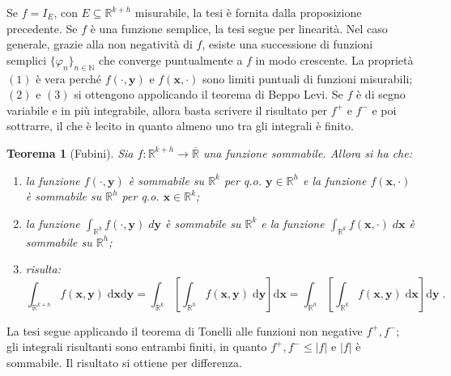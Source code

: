 \documentclass[a4paper,12pt]{report}
\theoremstyle{plain}
\newtheorem{thm}{Teorema}[section]
\theoremstyle{definition}
\theoremstyle{remark}
\newcommand{\diff}[1]{\mathrm{d}#1}
\numberwithin{equation}{section}
\begin{document}
\proof Se $f=I_E$, con $E\subseteq\mathbb{R}^{k+h}$ misurabile, la tesi è fornita dalla proposizione precedente. Se $f$ è una funzione semplice, la tesi segue per linearità. Nel caso generale, grazie alla non negatività di $f$, esiste una successione di funzioni semplici $\{
\varphi_n\}_{n\in\mathbb{N}}$ che converge puntualmente a $f$ in modo crescente. La proprietà $(1)$ è vera perché $f(\cdot,\mathbf{y})$ e $f(\mathbf{x},\cdot)$ sono limiti puntuali di funzioni misurabili; $(2)$ e $(3)$ si ottengono appolicando il teorema di Beppo Levi. Se 
$f$ è di segno variabile e in più integrabile, allora basta scrivere il risultato per $f^+$ e $f^-$ e poi sottrarre, il che è lecito in quanto almeno uno tra gli integrali è finito.
\endproof
\begin{thm}[Fubini] Sia $f:\mathbb{R}^{k+h}\to\overline{\mathbb{R}}$ una funzione sommabile. Allora si ha che:
\begin{enumerate}
 \item la funzione $f(\cdot,\mathbf{y})$ è sommabile su $\mathbb{R}^k$ per q.o. $\mathbf{y}\in\mathbb{R}^h$ e la funzione $f(\mathbf{x},\cdot)$ è sommabile su $\mathbb{R}^h$ per q.o. $\mathbf{x}\in\mathbb{R}^k$;
 \item la funzione $\int_{\mathbb{R}^h} f(\cdot,\mathbf{y})\;d\mathbf{y}$ è sommabile su $\mathbb{R}^k$ e la funzione $\int_{\mathbb{R}^k} f(\mathbf{x},\cdot)\;d\mathbf{x}$ è sommabile su $\mathbb{R}^h$;
\item risulta:
\begin{equation}
\int_{\mathbb{R}^{k+h}}f(\mathbf{x},\mathbf{y})\;\diff{\mathbf{x}}\diff{\mathbf{y}}=\int_{\mathbb{R}^k}\left[\int_{\mathbb{R}^h}f(\mathbf{x},\mathbf{y})\;\diff{\mathbf{y}}\right]\diff{\mathbf{x}}=\int_{\mathbb{R}^h}\left[\int_{\mathbb{R}^k}f(\mathbf{x},\mathbf{y})\;\diff{\mathbf{x}}\right]\diff{\mathbf{y}}\;.
\end{equation}
\end{enumerate}
\end{thm}
\proof La tesi segue applicando il teorema di Tonelli alle funzioni non negative $f^+,f^-$; gli integrali risultanti sono entrambi finiti, in
 quanto $f^+,f^-\le |f|$ e $|f|$ è sommabile. Il risultato si ottiene per differenza.
\endproof
\end{document}
